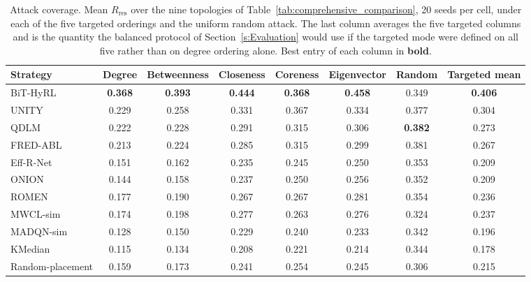 \begin{table}[!ht]
\centering
\footnotesize
\setlength{\tabcolsep}{6pt}
\caption{Attack coverage. Mean $R_{\mathrm{res}}$ over the nine topologies of Table~\ref{tab:comprehensive_comparison}, 20 seeds per cell, under each of the five targeted orderings and the uniform random attack. The last column averages the five targeted columns and is the quantity the balanced protocol of Section~\ref{s:Evaluation} would use if the targeted mode were defined on all five rather than on degree ordering alone. Best entry of each column in \textbf{bold}.}
\label{tab:attack_coverage}
\begin{tabular*}{\textwidth}{@{}l @{\extracolsep{\fill}} *{7}{c}@{}}
\toprule
\textbf{Strategy} & \textbf{Degree} & \textbf{Betweenness} & \textbf{Closeness} & \textbf{Coreness} & \textbf{Eigenvector} & \textbf{Random} & \textbf{Targeted mean} \\
\midrule
BiT-HyRL & \textbf{0.368} & \textbf{0.393} & \textbf{0.444} & \textbf{0.368} & \textbf{0.458} & 0.349 & \textbf{0.406} \\
\midrule
UNITY & 0.229 & 0.258 & 0.331 & 0.367 & 0.334 & 0.377 & 0.304 \\
QDLM & 0.222 & 0.228 & 0.291 & 0.315 & 0.306 & \textbf{0.382} & 0.273 \\
FRED-ABL & 0.213 & 0.224 & 0.285 & 0.315 & 0.299 & 0.381 & 0.267 \\
Eff-R-Net & 0.151 & 0.162 & 0.235 & 0.245 & 0.250 & 0.353 & 0.209 \\
ONION & 0.144 & 0.158 & 0.237 & 0.250 & 0.256 & 0.352 & 0.209 \\
ROMEN & 0.177 & 0.190 & 0.267 & 0.267 & 0.281 & 0.354 & 0.236 \\
MWCL-sim & 0.174 & 0.198 & 0.277 & 0.263 & 0.276 & 0.324 & 0.237 \\
MADQN-sim & 0.128 & 0.150 & 0.229 & 0.240 & 0.233 & 0.342 & 0.196 \\
KMedian & 0.115 & 0.134 & 0.208 & 0.221 & 0.214 & 0.344 & 0.178 \\
Random-placement & 0.159 & 0.173 & 0.241 & 0.254 & 0.245 & 0.306 & 0.215 \\
\bottomrule
\end{tabular*}
\end{table}
